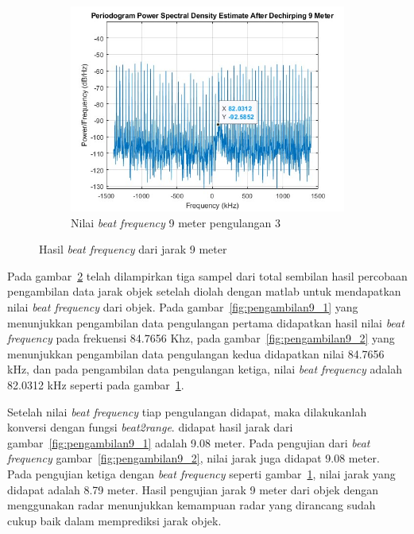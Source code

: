 \begin{figure}
\begin{subfigure}[b]{0.6\textwidth}
        \centering
		\includegraphics[scale=0.35]{pics/bab5/Range/3_9.jpg}
		\caption{Nilai \textit{beat frequency} 9 meter pengulangan 3}
		\label{fig:pengambilan9_3}
    \end{subfigure}
    \caption{Hasil \textit{beat frequency} dari jarak 9 meter}
    \label{fig:pengambilan9}
\end{figure}

Pada gambar~\ref{fig:pengambilan9} telah dilampirkan tiga sampel dari total sembilan hasil percobaan pengambilan data jarak objek setelah diolah dengan matlab untuk mendapatkan nilai \textit{beat frequency} dari objek. Pada gambar~\ref{fig:pengambilan9_1} yang menunjukkan pengambilan data pengulangan pertama didapatkan hasil nilai \textit{beat frequency} pada frekuensi 84.7656 Khz, pada gambar~\ref{fig:pengambilan9_2} yang menunjukkan pengambilan data pengulangan kedua didapatkan nilai 84.7656 kHz, dan pada pengambilan data pengulangan ketiga, nilai \textit{beat frequency} adalah 82.0312 kHz seperti pada gambar~\ref{fig:pengambilan9_3}.

Setelah nilai \textit{beat frequency} tiap pengulangan didapat, maka dilakukanlah konversi dengan fungsi \textit{beat2range}. didapat hasil jarak dari gambar~\ref{fig:pengambilan9_1} adalah 9.08 meter. Pada pengujian dari \textit{beat frequency} gambar~\ref{fig:pengambilan9_2}, nilai jarak juga didapat 9.08 meter. Pada pengujian ketiga dengan \textit{beat frequency} seperti gambar~\ref{fig:pengambilan9_3}, nilai jarak yang didapat adalah 8.79 meter. Hasil pengujian jarak 9 meter dari objek dengan menggunakan radar menunjukkan kemampuan radar yang dirancang sudah cukup baik dalam memprediksi jarak objek.
